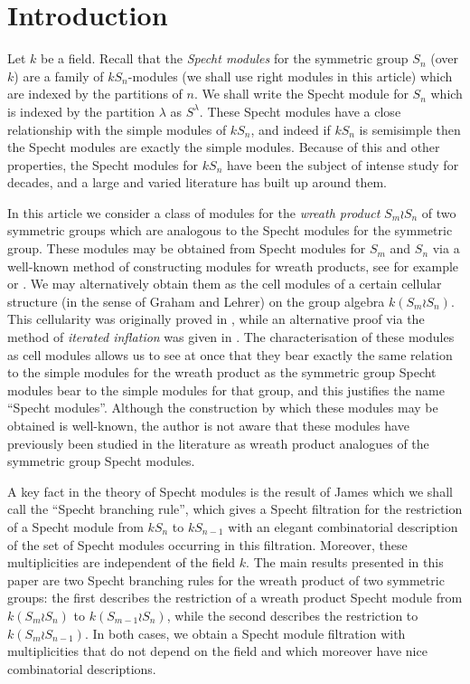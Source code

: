 \section{Introduction}
Let $k$ be a field. Recall that the \textit{Specht modules} for the symmetric group $S_n$ (over $k$) are a family of $kS_n$-modules
(we shall use right modules in this article) which are indexed by the partitions of $n$. We shall write the Specht module for $S_n$ which
is indexed by the partition $\lambda$ as $S^\lambda$. These Specht modules have a close relationship with the simple modules of
$kS_n$, and indeed if $kS_n$ is semisimple then the Specht modules are exactly the simple modules. Because of this and other properties,
the Specht modules for $kS_n$ have been the subject of intense study for decades, and a large and varied literature has built up around
them.

In this article we consider a class of modules for the \textit{wreath product} $S_m \wr S_n$ of two symmetric groups which are
analogous to the Specht modules for the symmetric group. These modules may be obtained from Specht modules for $S_m$ and $S_n$ via
a well-known method of constructing modules for wreath products, see for example \cite{CHTAN} or \cite[chapter 4]{JAMKER}.
We may alternatively obtain them as the cell modules of a certain cellular structure (in the sense of Graham and Lehrer) on the group
algebra $k(S_m \wr S_n)$. This cellularity was originally proved in \cite{GEGO}, while an alternative proof via the method of
\textit{iterated inflation} was given in \cite{GCSWPA}. The characterisation of these modules as cell modules
allows us to see at once that they bear exactly the same relation to the simple modules for the wreath product as the symmetric group
Specht modules bear to the simple modules for that group, and this justifies the name ``Specht modules''. Although the construction by
which these modules may be obtained is well-known, the author is not aware that these modules have previously been studied in the
literature as wreath product analogues of the symmetric group Specht modules.

A key fact in the theory of Specht modules is the result of James which we shall call the ``Specht branching rule'',
which gives a Specht filtration for the restriction of a Specht module from $kS_n$ to $kS_{n-1}$ with an
elegant combinatorial description of the set of Specht modules occurring in this filtration. Moreover, these multiplicities are
independent of the field $k$. The main results presented in this paper are two Specht branching rules for the wreath product of two
symmetric groups: the first describes the restriction of a wreath product Specht module from $k(S_m \wr S_n)$ to $k(S_{m-1} \wr S_n)$,
while the second describes the restriction to $k(S_m \wr S_{n-1})$. In both cases, we obtain a Specht module filtration with
multiplicities that do not depend on the field and which moreover have nice combinatorial descriptions.

